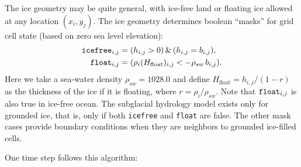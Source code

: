 \documentclass[gmd]{copernicus}   %
\newcommand{\text}{\textrm}
\begin{document}
The ice geometry may be quite general, with ice-free land or floating ice allowed at any location $(x_i,y_j)$.  The ice geometry determines boolean ``masks'' for grid cell state (based on zero sea level elevation):
\begin{align*}
\text{\texttt{icefree}}_{i,j} &= (h_{i,j} > 0)\, \&\, (h_{i,j} = b_{i,j}), \\
\text{\texttt{float}}_{i,j}   &= (\rho_i (H_{\text{float}})_{i,j} < - \rho_{sw}\, b_{i,j}).
\end{align*}
Here we take a sea-water density $\rho_{sw}=1028.0$ and define $H_{\text{float}}=h_{i,j} / (1 - r)$ as the thickness of the ice if it is floating, where $r=\rho_i / \rho_{sw}$.  Note that $\text{\texttt{float}}_{i,j}$ is also true in ice-free ocean.  The subglacial hydrology model exists only for grounded ice, that is, only if both \texttt{icefree} and \texttt{float} are false.  The other mask cases provide boundary conditions when they are neighbors to grounded ice-filled cells.

One time step follows this algorithm:
\end{document}
